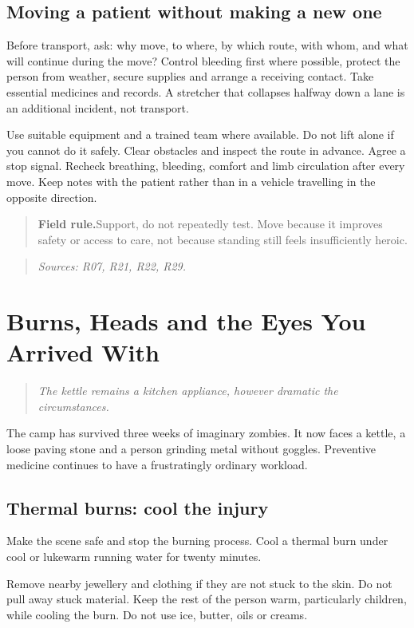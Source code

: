 \documentclass[10pt,openright]{book}
\newcommand{\fieldrule}[1]{\begin{quote}\textbf{Field rule.}\enspace #1\end{quote}}
\begin{document}
\section*{Moving a patient without making a new one}
Before transport, ask: why move, to where, by which route, with whom, and what will continue during the move? Control bleeding first where possible, protect the person from weather, secure supplies and arrange a receiving contact. Take essential medicines and records. A stretcher that collapses halfway down a lane is an additional incident, not transport.

Use suitable equipment and a trained team where available. Do not lift alone if you cannot do it safely. Clear obstacles and inspect the route in advance. Agree a stop signal. Recheck breathing, bleeding, comfort and limb circulation after every move. Keep notes with the patient rather than in a vehicle travelling in the opposite direction.

\fieldrule{Support, do not repeatedly test. Move because it improves safety or access to care, not because standing still feels insufficiently heroic.}
\begin{quote}\emph{Sources: R07, R21, R22, R29.}\end{quote}

\chapter{Burns, Heads and the Eyes You Arrived With}
\begin{quote}\emph{The kettle remains a kitchen appliance, however dramatic the circumstances.}\end{quote}
The camp has survived three weeks of imaginary zombies. It now faces a kettle, a loose paving stone and a person grinding metal without goggles. Preventive medicine continues to have a frustratingly ordinary workload.

\section*{Thermal burns: cool the injury}
Make the scene safe and stop the burning process. Cool a thermal burn under cool or lukewarm running water for twenty minutes.

Remove nearby jewellery and clothing if they are not stuck to the skin. Do not pull away stuck material. Keep the rest of the person warm, particularly children, while cooling the burn. Do not use ice, butter, oils or creams.
\end{document}
